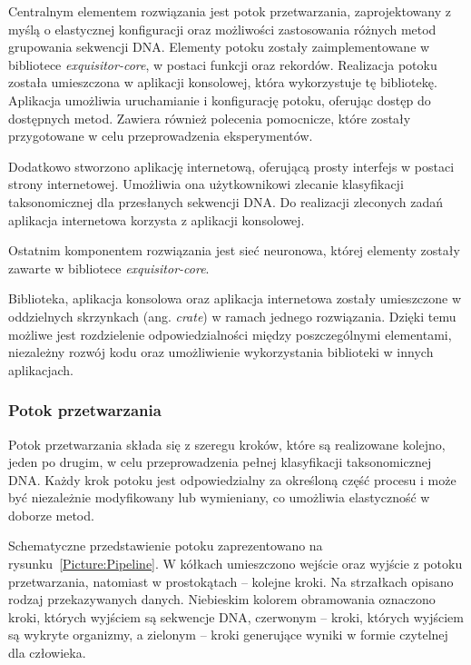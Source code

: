     Centralnym elementem rozwiązania jest potok przetwarzania, zaprojektowany z myślą o elastycznej konfiguracji oraz możliwości zastosowania różnych metod grupowania sekwencji DNA. Elementy potoku zostały zaimplementowane w bibliotece \textit{exquisitor-core}, w postaci funkcji oraz rekordów. Realizacja potoku została umieszczona w aplikacji konsolowej, która wykorzystuje tę bibliotekę. Aplikacja umożliwia uruchamianie i konfigurację potoku, oferując dostęp do dostępnych metod. Zawiera również polecenia pomocnicze, które zostały przygotowane w celu przeprowadzenia eksperymentów.

        Dodatkowo stworzono aplikację internetową, oferującą prosty interfejs w postaci strony internetowej. Umożliwia ona użytkownikowi zlecanie klasyfikacji taksonomicznej dla przesłanych sekwencji DNA. Do realizacji zleconych zadań aplikacja internetowa korzysta z aplikacji konsolowej.

        Ostatnim komponentem rozwiązania jest sieć neuronowa, której elementy zostały zawarte w bibliotece \textit{exquisitor-core}. 

        Biblioteka, aplikacja konsolowa oraz aplikacja internetowa zostały umieszczone w oddzielnych skrzynkach (ang. \textit{crate}) w ramach jednego rozwiązania. Dzięki temu możliwe jest rozdzielenie odpowiedzialności między poszczególnymi elementami, niezależny rozwój kodu oraz umożliwienie wykorzystania biblioteki w innych aplikacjach.


        \subsubsection{Potok przetwarzania}

            Potok przetwarzania składa się z szeregu kroków, które są realizowane kolejno, jeden po drugim, w celu przeprowadzenia pełnej klasyfikacji taksonomicznej DNA. Każdy krok potoku jest odpowiedzialny za określoną część procesu i może być niezależnie modyfikowany lub wymieniany, co umożliwia elastyczność w doborze metod.
           
            Schematyczne przedstawienie potoku zaprezentowano na rysunku~\ref{Picture:Pipeline}. W kółkach umieszczono wejście oraz wyjście z potoku przetwarzania, natomiast w prostokątach – kolejne kroki. Na strzałkach opisano rodzaj przekazywanych danych. Niebieskim kolorem obramowania oznaczono kroki, których wyjściem są sekwencje DNA, czerwonym – kroki, których wyjściem są wykryte organizmy, a zielonym – kroki generujące wyniki w formie czytelnej dla człowieka.

